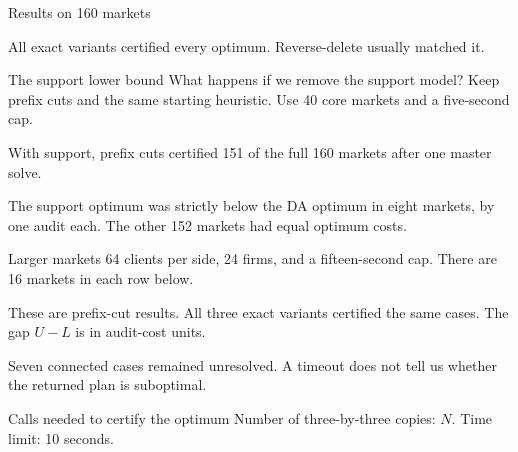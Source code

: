 \begin{frame}[t,label=core]{Results on 160 markets}
\small

All exact variants certified every optimum. Reverse-delete usually matched it.
\end{frame}

\begin{frame}[t,label=ablation]{The support lower bound}
\small
What happens if we remove the support model? Keep prefix cuts and the same
starting heuristic. Use 40 core markets and a five-second cap.
\begin{center}

\end{center}
\medskip
With support, prefix cuts certified 151 of the full 160 markets after
one master solve.

\medskip
The support optimum was strictly below the DA optimum in eight markets,
by one audit each. The other 152 markets had equal optimum costs.
\end{frame}

\begin{frame}[t,label=scale]{Larger markets}
\small
64 clients per side, 24 firms, and a fifteen-second cap.
There are 16 markets in each row below.
\begin{center}

\end{center}
These are prefix-cut results. All three exact variants certified the same
cases. The gap $U-L$ is in audit-cost units.

\medskip
Seven connected cases remained unresolved. A timeout does not tell us
whether the returned plan is suboptimal.
\end{frame}

\begin{frame}[t,label=stress]{Calls needed to certify the optimum}
\small
Number of three-by-three copies: $N$. Time limit: 10 seconds.
\par\medskip
{\centering

\par}
\end{frame}

